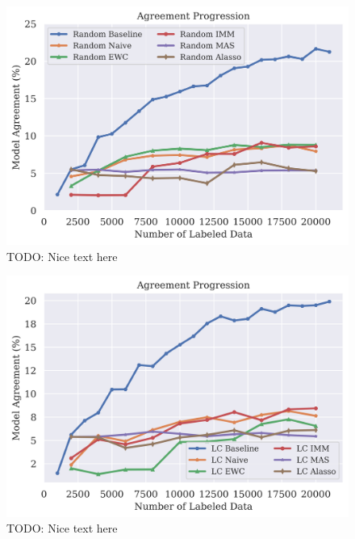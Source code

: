 \begin{figure}[h]
    \centering
    \includegraphics[width=0.8\linewidth]{images/results_CALMS/cifar100_label_random.png}
    \caption[Agreement Comparison for Model Stealing on CIFAR100 using the top1-label and the Active Learning strategy Random]{TODO: Nice text here}
    \label{fig:CALMSCIFAR100LabelRandom}
\end{figure}

\begin{figure}[h]
    \centering
    \includegraphics[width=0.8\linewidth]{images/results_CALMS/cifar100_label_lc.png}
    \caption[Agreement Comparison for Model Stealing on CIFAR100 using the top1-label and the Active Learning strategy LC]{TODO: Nice text here}
    \label{fig:CALMSCIFAR100LabelLC}
\end{figure}

